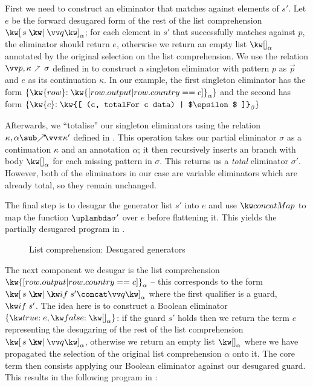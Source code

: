 First we need to construct an eliminator that matches against elements of $s'$. Let $e$ be the forward desugared form of the rest of the list comprehension $\annListComp{s}{\vec{q}}{\alpha}$; for each element in $s'$ that successfully matches against $p$, the eliminator should return $e$, otherwise we return an empty list $\annNil{\alpha}$ annotated by the original selection on the list comprehension. We use the relation $\vec{p}, \kappa \clauseFwdR \sigma$ defined in  to construct a singleton eliminator with pattern $p$ as $\vec{p}$ and $e$  as its continuation $\kappa$. In our example, the first singleton eliminator has the form $\{\elimVar{\kw{row}}{\kw{[ row.output | row.country == c ]}_{\alpha} }\}$ and the second has form $\{\elimVar{\kw{c}}{\kw{[ (c, totalFor c data) | $\epsilon$ ]}_{\beta}}\}$

Afterwards, we ``totalise'' our singleton eliminators using the relation $\totaliseFwd{\kappa}{\alpha}{\vec{\pi}}{\kappa'}$ defined in . This operation takes our partial eliminator $\sigma$ as a continuation $\kappa$ and an annotation $\alpha$; it then recursively inserts an branch with body $\annNil{\alpha}$ for each missing pattern in $\sigma$. This returns us a \textit{total} eliminator $\sigma'$. However, both of the eliminators in our case are variable eliminators which are already total, so they remain unchanged.

The final step is to desugar the generator list $s'$ into $e$ and use $\funConcatMap$ to map the function $\exLambda{\sigma'}$ over $e$ before flattening it. This yields the partially desugared program in .


\begin{figure}[H]
   \small
   
   \caption{List comprehension: Desugared generators}
   \label{fig:surface-language:example-2}
\end{figure}

\noindent
The next component we desugar is the list comprehension $\kw{[ row.output | row.country == c ]}_{\alpha}$ -- this corresponds to the form $\annListComp{s}{\qualGuard{s'} \concat \vec{q}}{\alpha}$ where the first qualifier is a guard, $\qualGuard{s'}$. The idea here is to construct a Boolean eliminator $\elimBool{e}{\annNil{\alpha}}$: if the guard $s'$ holds then we return the term $e$ representing the desugaring of the rest of the list comprehension $\annListComp{s}{\vec{q}}{\alpha}$, otherwise we return an empty list $\annNil{\alpha}$ where we have propagated the selection of the original list comprehension $\alpha$ onto it. The core term then consists applying our Boolean eliminator against our desugared guard. This results in the following program in :

